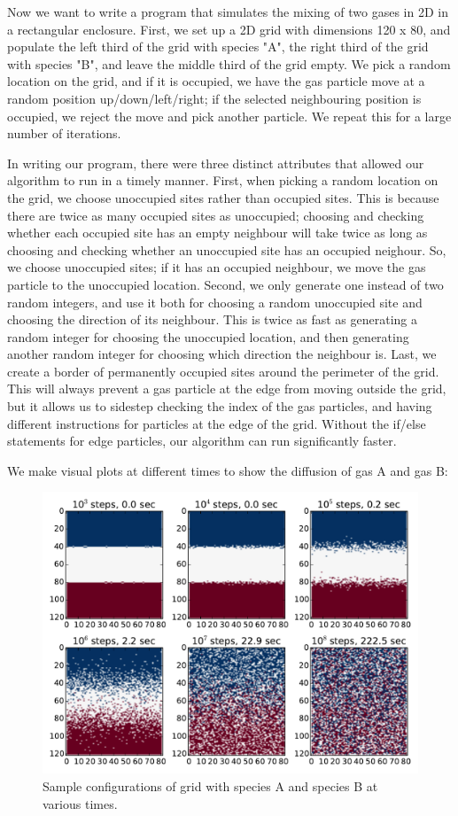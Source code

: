 \documentclass{article}
\begin{document}
\smallskip
Now we want to write a program that simulates the mixing of two gases in 2D in a rectangular enclosure. First, we set up a 2D grid with dimensions 120 x 80, and populate the left third of the grid with species "A", the right third of the grid with species "B", and leave the middle third of the grid empty. We pick a random location on the grid, and if it is occupied, we have the gas particle move at a random position up/down/left/right; if the selected neighbouring position is occupied, we reject the move and pick another particle. We repeat this for a large number of iterations. \par
In writing our program, there were three distinct attributes that allowed our algorithm to run in a timely manner. First, when picking a random location on the grid, we choose unoccupied sites rather than occupied sites. This is because there are twice as many occupied sites as unoccupied; choosing and checking whether each occupied site has an empty neighbour will take twice as long as choosing and checking whether an unoccupied site has an occupied neighour. So, we choose unoccupied sites; if it has an occupied neighbour, we move the gas particle to the unoccupied location. Second, we only generate one instead of two random integers, and use it both for choosing a random unoccupied site and choosing the direction of its neighbour. This is twice as fast as generating a random integer for choosing the unoccupied location, and then generating another random integer for choosing which direction the neighbour is. Last, we create a border of permanently occupied sites around the perimeter of the grid. This will always prevent a gas particle at the edge from moving outside the grid, but it allows us to sidestep checking the index of the gas particles, and having different instructions for particles at the edge of the grid. Without the if/else statements for edge particles, our algorithm can run significantly faster.\par
We make visual plots at different times to show the diffusion of gas A and gas B:\par
\begin{figure}[H]
\centering
\includegraphics[width=12cm]{GP1_3b_1.pdf}
\caption{Sample configurations of grid with species A and species B at various times.}
\label{fig:grid}
\end{figure}
\end{document}
